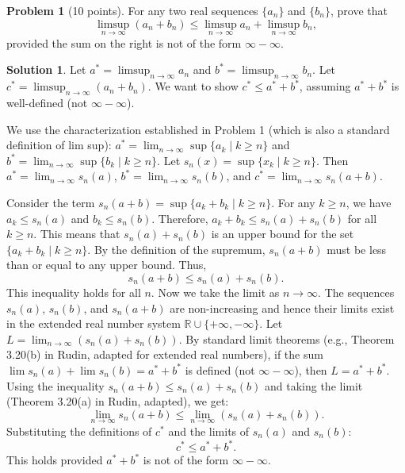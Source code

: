 \documentclass[12pt,oneside]{article}
\theoremstyle{definition}
\newtheorem{problem}{Problem}
\newtheorem*{solution}{Solution} %
\begin{document}
\bigskip
\bigskip

\begin{problem}[10 points]
For any two real sequences $\{a_n\}$ and $\{b_n\}$, prove that
\[
\limsup_{n\rightarrow \infty}(a_n + b_n) \leq \limsup_{n\rightarrow \infty} a_n + \limsup_{n\rightarrow \infty} b_n,
\]
provided the sum on the right is not of the form $\infty - \infty$. 
\end{problem}

\begin{solution}
Let $a^* = \limsup_{n\rightarrow \infty} a_n$ and $b^* = \limsup_{n\rightarrow \infty} b_n$. Let $c^* = \limsup_{n\rightarrow \infty}(a_n + b_n)$. We want to show $c^* \le a^* + b^*$, assuming $a^*+b^*$ is well-defined (not $\infty-\infty$).

We use the characterization established in Problem 1 (which is also a standard definition of lim sup):
$a^* = \lim_{n\to\infty} \sup\{a_k \mid k \ge n\}$ and $b^* = \lim_{n\to\infty} \sup\{b_k \mid k \ge n\}$.
Let $s_n(x) = \sup\{x_k \mid k \ge n\}$. Then $a^* = \lim_{n\to\infty} s_n(a)$, $b^* = \lim_{n\to\infty} s_n(b)$, and $c^* = \lim_{n\to\infty} s_n(a+b)$.

Consider the term $s_n(a+b) = \sup\{a_k + b_k \mid k \ge n\}$.
For any $k \ge n$, we have $a_k \le s_n(a)$ and $b_k \le s_n(b)$.
Therefore, $a_k + b_k \le s_n(a) + s_n(b)$ for all $k \ge n$.
This means that $s_n(a) + s_n(b)$ is an upper bound for the set $\{a_k + b_k \mid k \ge n\}$.
By the definition of the supremum, $s_n(a+b)$ must be less than or equal to any upper bound. Thus,
\[ s_n(a+b) \le s_n(a) + s_n(b). \]
This inequality holds for all $n$. Now we take the limit as $n \to \infty$.
The sequences $s_n(a)$, $s_n(b)$, and $s_n(a+b)$ are non-increasing and hence their limits exist in the extended real number system $\mathbb{R} \cup \{+\infty, -\infty\}$.
Let $L = \lim_{n\to\infty} (s_n(a) + s_n(b))$. By standard limit theorems (e.g., Theorem 3.20(b) in Rudin, adapted for extended real numbers), if the sum $\lim s_n(a) + \lim s_n(b) = a^* + b^*$ is defined (not $\infty-\infty$), then $L = a^* + b^*$.
Using the inequality $s_n(a+b) \le s_n(a) + s_n(b)$ and taking the limit (Theorem 3.20(a) in Rudin, adapted), we get:
\[ \lim_{n\to\infty} s_n(a+b) \le \lim_{n\to\infty} (s_n(a) + s_n(b)). \]
Substituting the definitions of $c^*$ and the limits of $s_n(a)$ and $s_n(b)$:
\[ c^* \le a^* + b^*. \]
This holds provided $a^*+b^*$ is not of the form $\infty - \infty$.


\end{solution}
\end{document}
